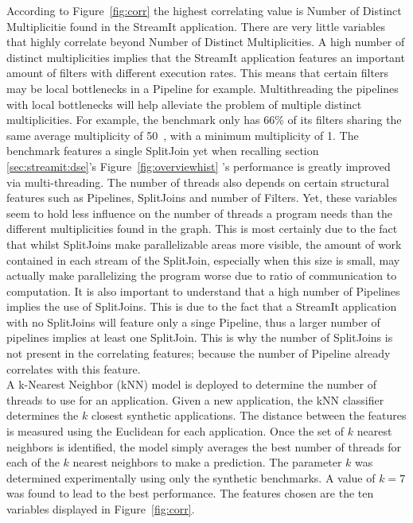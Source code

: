According to Figure~\ref{fig:corr} the highest correlating value is Number of Distinct Multiplicitie found in the StreamIt application.
There are very little variables that highly correlate beyond Number of Distinct Multiplicities.
A high number of distinct multiplicities implies that the StreamIt application features an important amount of filters with different execution rates.
This means that certain filters may be local bottlenecks in a Pipeline for example.
Multithreading the pipelines with local bottlenecks will help alleviate the problem of multiple distinct multiplicities.
For example, the benchmark  only has 66\% of its filters sharing the same average multiplicity of 50~\cite{thiesStreamit2010}, with a minimum multiplicity of 1. 
The benchmark features a single SplitJoin yet when recalling section \ref{sec:streamit:dse}'s Figure~\ref{fig:overviewhist} 's performance is greatly improved via multi-threading.
The number of threads also depends on certain structural features such as Pipelines, SplitJoins and number of Filters.
Yet, these variables seem to hold less influence on the number of threads a program needs than the different multiplicities found in the graph.
This is most certainly due to the fact that whilst SplitJoins make parallelizable areas more visible, the amount of work contained in each stream of the SplitJoin, especially when this size is small, may actually make parallelizing the program worse due to ratio of communication to computation.
It is also important to understand that a high number of Pipelines implies the use of SplitJoins.
This is due to the fact that a StreamIt application with no SplitJoins will feature only a singe Pipeline, thus a larger number of pipelines implies at least one SplitJoin.
This is why the number of SplitJoins is not present in the correlating features; because the number of Pipeline already correlates with this feature.\\

A k-Nearest Neighbor (kNN) model is deployed to determine the number of threads to use for an application.
Given a new application, the kNN classifier determines the $k$ closest synthetic applications.
The distance between the features is measured using the Euclidean for each application.
Once the set of $k$ nearest neighbors is identified, the model simply averages the best number of threads for each of the $k$ nearest neighbors to make a prediction.
The parameter $k$ was determined experimentally using only the synthetic benchmarks.
A value of $k=7$ was found to lead to the best performance.
The features chosen are the ten variables displayed in Figure~\ref{fig:corr}.

